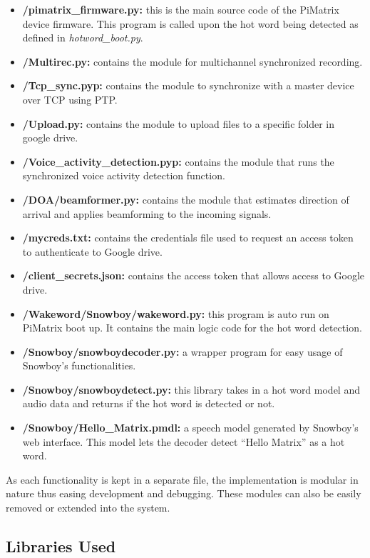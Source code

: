 \documentclass[hidelinks,12pt]{report} %
\begin{document}
	\begin{itemize}
		\item{\textbf{/pimatrix\_firmware.py: }}
		this is the main source code of the PiMatrix device firmware. This program is called upon the hot word being detected as defined in \textit{hotword\_boot.py}.
		\item{\textbf{/Multirec.py: }}
		contains the module for multichannel synchronized recording.
		\item{\textbf{/Tcp\_sync.pyp: }}
		contains the module to synchronize with a master device over TCP using PTP.
		\item{\textbf{/Upload.py: }}
		contains the module to upload files to a specific folder in google drive.
		\item{\textbf{/Voice\_activity\_detection.pyp: }}
		contains the module that runs the synchronized voice activity detection function. 
		\item{\textbf{/DOA/beamformer.py: }}
		contains the module that estimates direction of arrival and applies beamforming to the incoming signals.
		\item{\textbf{/mycreds.txt: }}
		contains the credentials file used to request an access token to authenticate to Google drive. 
		\item{\textbf{/client\_secrets.json: }}
		contains the access token that allows access to Google drive. 
		\item{\textbf{/Wakeword/Snowboy/wakeword.py: }}
		this program is auto run on PiMatrix boot up. It contains the main logic code for the hot word detection.
		\item{\textbf{/Snowboy/snowboydecoder.py: }}
		a wrapper program for easy usage of Snowboy’s functionalities.
		\item{\textbf{/Snowboy/snowboydetect.py: }}
		this library takes in a hot word model and audio data and returns if the hot word is detected or not.
		\item{\textbf{/Snowboy/Hello\_Matrix.pmdl: }}
		a speech model generated by Snowboy’s web interface. This model lets the decoder detect “Hello Matrix” as a hot word.

		
	\end{itemize}

As each functionality is kept in a separate file, the implementation is modular in nature thus easing development and debugging. These modules can also be easily removed or extended into the system. 

\subsection{Libraries Used}
\end{document}
